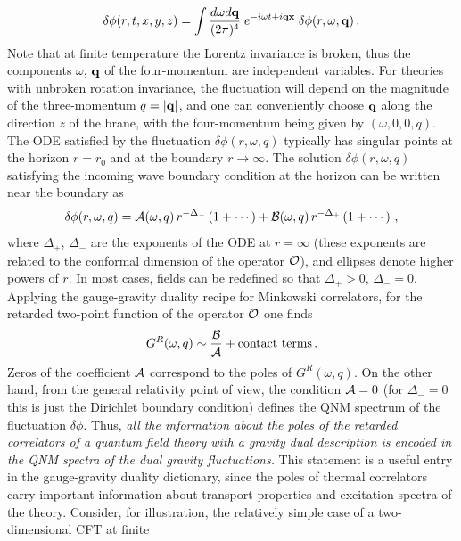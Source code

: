 \documentclass[]{iopart}
\begin{document}
%
\begin{equation}
\delta \phi (r,t,x,y,z) = \int \frac{d\omega d \bf{q}}{(2\pi)^4} \; e^{-i \omega t + i\bf{q}\bf{x}}
\; \delta\phi (r,\omega, {\bf{q}}) \,.
\end{equation}
%
Note that at finite temperature the Lorentz invariance is broken, thus the
components $\omega$, ${\bf{q}}$ of the four-momentum are independent
variables.  For theories with unbroken rotation invariance, the fluctuation
will depend on the magnitude of the three-momentum $q = |{\bf{q}}|$, and one
can conveniently choose ${\bf{q}}$ along the direction $z$ of the brane, with
the four-momentum being given by $(\omega, 0,0, q)$.  The ODE satisfied by the
fluctuation $\delta\phi (r,\omega, q)$ typically has singular points at the
horizon $r=r_0$ and at the boundary $r\rightarrow \infty$.  The solution
$\delta\phi (r,\omega, q)$ satisfying the incoming wave boundary condition at
the horizon can be written near the boundary as
%
\begin{equation}
\delta\phi (r,\omega, q) = {\cal A} (\omega,q)\, r^{- \Delta_-} \left( 1 + \cdots \right)
+ {\cal B} (\omega,q)\, r^{- \Delta_+ } \left( 1 + \cdots \right)\,,
\end{equation}
%
where $\Delta_+$, $\Delta_-$ are the exponents of the ODE at $r=\infty$ (these
exponents are related to the conformal dimension of the operator ${\cal O}$),
and ellipses denote higher powers of $r$. In most cases, fields can be
redefined so that $\Delta_+>0$, $\Delta_-=0$. Applying the gauge-gravity
duality recipe for Minkowski correlators, for the retarded two-point function
of the operator ${\cal O}$ one finds
%
\begin{equation}
G^R (\omega,q) \sim \frac{{\cal B}}{{\cal A}} + \mbox{contact terms}\,.
\label{main_rat}
\end{equation}
%
Zeros of the coefficient ${\cal A}$ correspond to the poles of
$G^R(\omega,q)$.  On the other hand, from the general relativity point of
view, the condition ${\cal A}=0$ (for $\Delta_-=0$ this is just the Dirichlet
boundary condition) defines the QNM spectrum of the fluctuation $\delta \phi$.
Thus, {\it all the information about the poles of the retarded correlators of
  a quantum field theory with a gravity dual description is encoded in the QNM
  spectra of the dual gravity fluctuations.}
%
This statement is a useful entry in the gauge-gravity duality dictionary,
since the poles of thermal correlators carry important information about
transport properties and excitation spectra of the theory.  Consider, for
illustration, the relatively simple case of a two-dimensional CFT at finite
\end{document}
